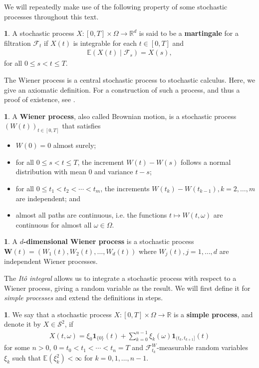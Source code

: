 \documentclass[english]{article}
\numberwithin{equation}{section}
\numberwithin{figure}{section}
\theoremstyle{bolddescit}
\theoremstyle{definition}
\newtheorem{definition}[theorem]{\protect\definitionname}
\theoremstyle{definition}
\theoremstyle{plain}
\theoremstyle{plain}
\theoremstyle{bolddesc}
\theoremstyle{plain}
\theoremstyle{remark}
\providecommand{\definitionname}{Definition}
\begin{document}
We will repeatedly make use of the following property of some stochastic processes throughout this text.

\begin{definition}
  A stochastic process $X : [0,T] \times \Omega \to \mathbb{R}^d$ is said to be a \textbf{martingale} for a filtration $\mathcal{F}_t$ if $X(t)$ is integrable for each $t \in [0,T]$ and
  \begin{align*}
    \mathbb{E}(X(t) \mid \mathcal{F}_s) = X(s),
  \end{align*}
  for all $0 \le s < t \le T$.
\end{definition}

The Wiener process is a central stochastic process to stochastic calculus. Here, we give an axiomatic definition. For a construction of such a process, and thus a proof of existence, see \textcite{capinski_stochastic_2012}.

\begin{definition}
  A \textbf{Wiener process}, also called Brownian motion, is a stochastic process $(W(t))_{t \in [0,T]}$ that satisfies
  \begin{itemize}
    \item $W(0) = 0$ almost surely;
    \item for all $0 \le s < t \le T$, the increment $W(t) - W(s)$ follows a normal distribution with mean 0 and variance $t - s$;
    \item for all $0 \le t_1 < t_2 < \cdots < t_m$, the increments $W(t_k) - W(t_{k-1}), k=2,\ldots,m$ are independent; and
    \item almost all paths are continuous, i.e. the functions $t \mapsto W(t,\omega)$ are continuous for almost all $\omega \in \Omega$.
  \end{itemize}
\end{definition}

\begin{definition}
  A \textbf{$d$-dimensional Wiener process} is a stochastic process $\mathbf{W}(t) = (W_1(t), W_2(t), \ldots, W_d(t))$ where $W_j(t), j=1,\ldots,d$ are independent Wiener processes.
\end{definition}

The \textit{It\^o integral} allows us to integrate a stochastic process with respect to a Wiener process, giving a random variable as the result. We will first define it for \textit{simple processes} and extend the definitions in steps.

\begin{definition}
  We say that a stochastic process $X : [0,T] \times \Omega \to \mathbb{R}$ is a \textbf{simple process}, and denote it by $X \in \mathcal{S}^2$, if
  \begin{align*}
    X(t,\omega) = \xi_0 \mathbf{1}_{\{0\}}(t) + \sum_{k=0}^{n-1} \xi_k(\omega) \mathbf{1}_{(t_k,t_{k+1}]}(t)
  \end{align*}
  for some $n > 0$, $0 = t_0 < t_1 < \cdots < t_n = T$ and $\mathcal{F}^W_{t_k}$-measurable random variables $\xi_k$ such that $\mathbb{E}(\xi_k^2) < \infty$ for $k = 0,1,\ldots,n-1$.
\end{definition}
\end{document}
